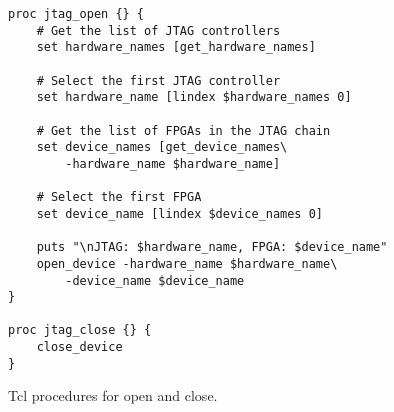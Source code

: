 \documentclass[10pt,twoside]{article}
\begin{document}
%
\begin{figure}[p]
\begin{center}
\begin{minipage}{100mm}
\begin{verbatim}
proc jtag_open {} {
    # Get the list of JTAG controllers
    set hardware_names [get_hardware_names]

    # Select the first JTAG controller
    set hardware_name [lindex $hardware_names 0]

    # Get the list of FPGAs in the JTAG chain
    set device_names [get_device_names\
        -hardware_name $hardware_name]

    # Select the first FPGA
    set device_name [lindex $device_names 0]

    puts "\nJTAG: $hardware_name, FPGA: $device_name"
    open_device -hardware_name $hardware_name\
        -device_name $device_name
}

proc jtag_close {} {
    close_device
}
\end{verbatim}
\end{minipage}
\end{center}
\caption{Tcl procedures for open and close.}
\label{fig:tcl_open_close}
\end{figure}
\end{document}
